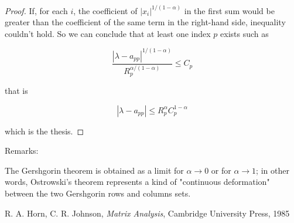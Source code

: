 \documentclass[12pt]{article}
\begin{document}
\begin{proof}
If, for each $i$, the coefficient of $\left\vert x_{i}\right\vert ^{1/(1-\alpha )}$ in the first
sum would be greater than the coefficient of the same term in the right-hand
side, inequality couldn't hold. So we can conclude that at least one index $p$ exists
such as

\[
\frac{\left\vert \lambda -a_{pp}\right\vert ^{1/(1-\alpha )}}{R_{p}^{\alpha
/(1-\alpha )}}\leq C_{p} 
\]

that is

\[
\left\vert \lambda -a_{pp}\right\vert \leq R_{p}^{\alpha }C_{p}^{1-\alpha } 
\]

which is the thesis.
\end{proof}

\bigskip

Remarks:

The Gershgorin theorem is obtained as a limit for $\alpha \rightarrow 0$ or
for $\alpha \rightarrow 1$; in other words, Ostrowski's theorem represents a kind of "continuous deformation" between the two Gershgorin rows and columns sets.

\begin{thebibliography}{6}
 R. A. Horn, C. R. Johnson,
\emph{Matrix Analysis}, Cambridge University Press, 1985
\end{thebibliography}
\end{document}
